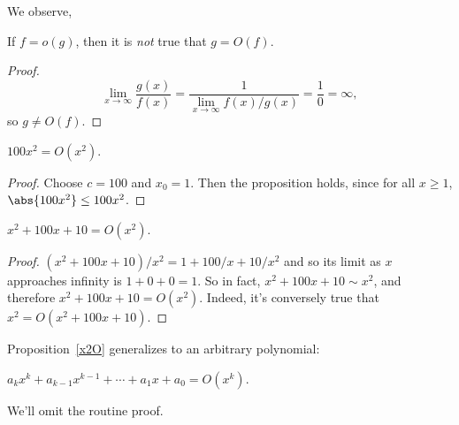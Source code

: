 We observe,
\begin{lemma}
If $f = o(g)$, then it is \emph{not} true that $g = O(f)$.
\end{lemma}
\begin{proof}
\[
\lim_{x \rightarrow \infty} \frac{g(x)}{f(x)} =
 \frac{1}{\lim_{x \rightarrow \infty} f(x)/g(x)} =
 \frac{1}{0} = \infty,
\]
so $g \neq O(f)$.

\iffalse We will prove the equivalent contrapositive, i.e., that if
$g=O(f)$ then it is not true that $f=o(g)$.  If $g=O(f)$ then there
exists a constant $c \geq 0$ and an $x_0$ such that for all $x \geq
x_0$, $\abs{g(x)} \leq c f(x)$.  Then for all $x \geq x_0$, we have
that $f(x)/\abs{g(x)} = f(x)/g(x) >c>0$ (the first equality uses the
nonnegativity of $g$).  Thus $\lim_{x \rightarrow \infty} f(x)/g(x)
>0$ and so it is not true that $f=o(g)$.  \fi

\end{proof}

\begin{proposition}
$100x^2 = O(x^2)$.
\end{proposition}

\begin{proof}
Choose $c = 100$ and $x_0 = 1$.  Then the proposition holds, since for all
$x \geq 1$, $\abs{100x^2} \leq 100 x^2$.
\end{proof}

\begin{proposition}\label{x2O}
$x^2 + 100x + 10 = O(x^2)$.
\end{proposition}

\begin{proof}
$(x^2 + 100x + 10)/x^2 = 1 + 100/x + 10/x^2$ and so its limit as $x$
approaches infinity is $1 + 0 + 0 = 1$.  So in fact, $x^2 + 100x + 10 \sim
x^2$, and therefore $x^2 + 100x + 10 = O(x^2)$.  Indeed, it's conversely
true that $x^2= O(x^2 + 100x + 10)$.
\end{proof}

Proposition~\ref{x2O} generalizes to an arbitrary polynomial:
\begin{proposition}
    $a_k x^k + a_{k-1} x^{k-1} + \cdots + a_1x + a_0 = O(x^k)$.
\end{proposition}
We'll omit the routine proof.

